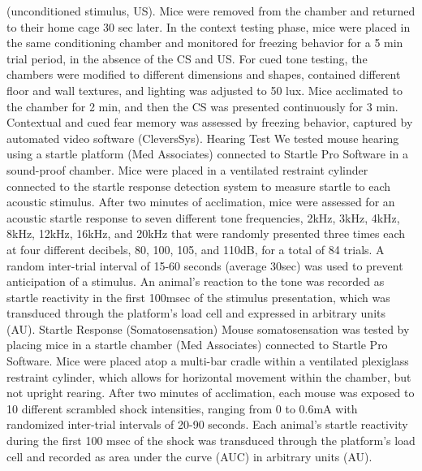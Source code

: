 (unconditioned stimulus, US). Mice were removed from the chamber and returned to
their home cage 30 sec later. In the context testing phase, mice were placed in
the same conditioning chamber and monitored for freezing behavior for a 5 min
trial period, in the absence of the CS and US. For cued tone testing, the
chambers were modified to different dimensions and shapes, contained different
floor and wall textures, and lighting was adjusted to 50 lux. Mice acclimated to
the chamber for 2 min, and then the CS was presented continuously for 3 min.
Contextual and cued fear memory was assessed by freezing behavior, captured by
automated video software (CleversSys). 
Hearing Test
We tested mouse hearing using a startle platform (Med Associates) connected to
Startle Pro Software in a sound-proof chamber. Mice were placed in a ventilated
restraint cylinder connected to the startle response detection system to measure
startle to each acoustic stimulus. After two minutes of acclimation, mice were
assessed for an acoustic startle response to seven different tone frequencies,
2kHz, 3kHz, 4kHz, 8kHz, 12kHz, 16kHz, and 20kHz that were randomly presented
three times each at four different decibels, 80, 100, 105, and 110dB, for a
total of 84 trials. A random inter-trial interval of 15-60 seconds (average
30sec) was used to prevent anticipation of a stimulus. An animal’s reaction to
the tone was recorded as startle reactivity in the first 100msec of the stimulus
presentation, which was transduced through the platform’s load cell and
expressed in arbitrary units (AU).  
Startle Response (Somatosensation)
Mouse somatosensation was tested by placing mice in a startle chamber (Med
Associates) connected to Startle Pro Software. Mice were placed atop a multi-bar
cradle within a ventilated plexiglass restraint cylinder, which allows for
horizontal movement within the chamber, but not upright rearing. After two
minutes of acclimation, each mouse was exposed to 10 different scrambled shock
intensities, ranging from 0 to 0.6mA with randomized inter-trial intervals of
20-90 seconds. Each animal’s startle reactivity during the first 100 msec of the
shock was transduced through the platform’s load cell and recorded as area under
the curve (AUC) in arbitrary units (AU). 

